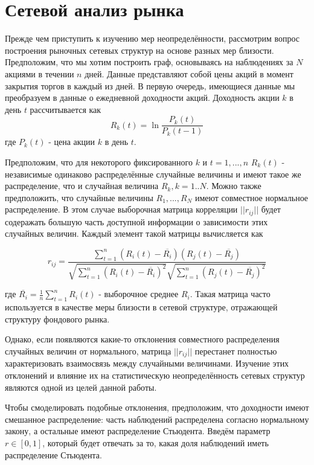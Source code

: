 \section{Сетевой анализ рынка}
Прежде чем приступить к изучению мер неопределённости, рассмотрим вопрос построения рыночных сетевых структур на основе разных мер близости. Предположим, что мы хотим построить граф, основываясь на наблюдениях за $N$ акциями в течении $n$ дней. Данные представляют собой цены акций в момент закрытия торгов в каждый из дней. В первую очередь, имеющиеся данные мы преобразуем в данные о ежедневной доходности акций. Доходность акции $k$ в день $t$ рассчитывается как	
\begin{equation}
	R_k(t)=\ln\frac{P_k(t)}{P_k(t-1)}
\end{equation}
где $P_k(t)$ -  цена акции $k$ в день $t$. 

Предположим, что для некоторого фиксированного $k$ и $t=1,...,n$ $R_k(t)$ - независимые одинаково распределённые случайные величины и имеют такое же распределение, что и случайная величина $R_k, k=1..N$. Можно также предположить, что случайные величины $R_1, ... ,R_N$ имеют совместное нормальное распределение. В этом случае выборочная матрица корреляции $||r_{i j}||$ будет содеражать большую часть доступной информации о зависимости этих случайных величин\cite{anderson}. Каждый элемент такой матрицы вычисляется как 

\begin{equation}
	r_{i j} = \frac{ \sum_{t=1}^{n} (R_i(t) - \overline{R_i})(R_j(t) - \overline{R_j})  }{ \sqrt{ \sum_{t=1}^{n} (R_i(t) - \overline{R_i})^2 }\sqrt{ \sum_{t=1}^{n} (R_j(t) - \overline{R_j})^2 } }
\end{equation}

где $\overline{R_i} =  \frac{1}{n}\sum_{t=1}^{n} R_i(t)$ - выборочное среднее $R_i$. Такая матрица часто используется в качестве меры близости в сетевой структуре, отражающей структуру фондового рынка.

Однако, если появляются какие-то отклонения совместного распределения случайных величин от нормального, матрица $||r_{i j}||$ перестанет полностью характеризовать взаимосвязь между случайными величинами. Изучение этих отклонений и влияние их на статистическую неопределённость сетевых структур являются одной из целей данной работы. 

Чтобы смоделировать подобные отклонения, предположим, что доходности имеют смешанное распределение: часть наблюдений распределена согласно нормальному закону, а остальные имеют распределение Стьюдента. Введём параметр $r \in [0,1]$, который будет отвечать за то, какая доля наблюдений иметь распределение Стьюдента.

